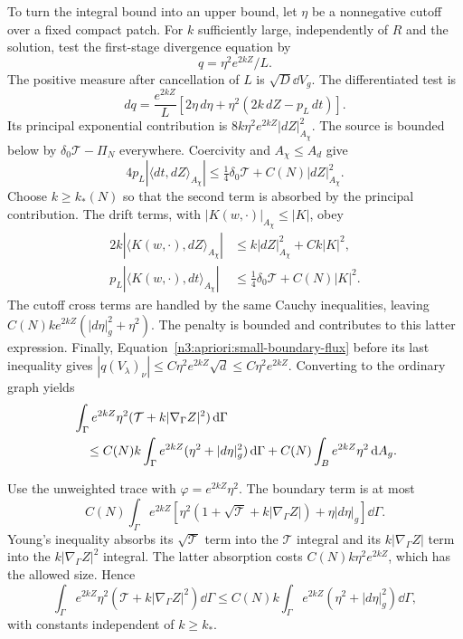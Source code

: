 To turn the integral bound into an upper bound, let $\eta$ be a
nonnegative cutoff over a fixed compact patch.  For $k$ sufficiently
large, independently of $R$ and the solution, test the first-stage
divergence equation by
\[
 q=\eta^2e^{2kZ}/L.
\]
The positive measure after cancellation of $L$ is
$\sqrt D\dd V_g$.  The differentiated test is
\[
 dq=\frac{e^{2kZ}}L
       [2\eta\,d\eta+\eta^2(2k\,dZ-p_L\,dt)].
\]
Its principal exponential contribution is
$8k\eta^2e^{2kZ}|dZ|_{A_\chi}^2$.  The source is bounded below
by $\delta_0\mathcal T-\Pi_N$ everywhere.
Coercivity and $A_\chi\le A_d$ give
\[
 4p_L|\langle dt,dZ\rangle_{A_\chi}|
 \le\tfrac14\delta_0\mathcal T+C(N)|dZ|_{A_\chi}^2.
\]
Choose $k\ge k_*(N)$ so that the second term is absorbed by the
principal contribution.  The drift terms, with $|K(w,\cdot)|_{A_\chi}
\le |K|$, obey
\begin{align*}
 2k|\langle K(w,\cdot),dZ\rangle_{A_\chi}|
   &\le k|dZ|_{A_\chi}^2+Ck|K|^2,\\
 p_L|\langle K(w,\cdot),dt\rangle_{A_\chi}|
   &\le\tfrac14\delta_0\mathcal T+C(N)|K|^2.
\end{align*}
The cutoff cross terms are handled by the same Cauchy inequalities,
leaving $C(N)k e^{2kZ}(|d\eta|_g^2+\eta^2)$.
The penalty is bounded and contributes to this latter expression.
Finally, Equation~\eqref{n3:apriori:small-boundary-flux} before its last
inequality gives
$|q(V_\lambda)_\nu|\le C\eta^2e^{2kZ}\sqrt d
\le C\eta^2e^{2kZ}$.
Converting to the ordinary graph yields
\begin{align}
 &\int_\Gamma e^{2kZ}\eta^2
       (\mathcal T+k|\nabla_\Gamma Z|^2)\,\mathrm d\Gamma\notag\\
 &\quad\le C(N)k\int_\Gamma e^{2kZ}
                (\eta^2+|d\eta|_g^2)\,\mathrm d\Gamma
               +C(N)\int_B e^{2kZ}\eta^2\,\mathrm d A_g.
 \label{n3:apriori:iteration-energy-boundary}
\end{align}

Use the unweighted trace with $\varphi=e^{2kZ}\eta^2$.  The boundary
term is at most
\[
 C(N)\int_\Gamma e^{2kZ}
   \left[\eta^2(1+\sqrt{\mathcal T}
                   +k|\nabla_\Gamma Z|)+\eta|d\eta|_g\right]
                                                   \dd\Gamma.
\]
Young's inequality absorbs its $\sqrt{\mathcal T}$ term into the
$\mathcal T$ integral and its $k|\nabla_\Gamma Z|$ term into the
$k|\nabla_\Gamma Z|^2$ integral.  The latter absorption costs
$C(N)k\eta^2e^{2kZ}$, which has the allowed size.  Hence
\begin{equation}
 \int_\Gamma e^{2kZ}\eta^2
       (\mathcal T+k|\nabla_\Gamma Z|^2)\dd\Gamma
 \le C(N)k\int_\Gamma e^{2kZ}
                   (\eta^2+|d\eta|_g^2)\dd\Gamma,
 \label{n3:apriori:iteration-energy}
\end{equation}
with constants independent of $k\ge k_*$.

